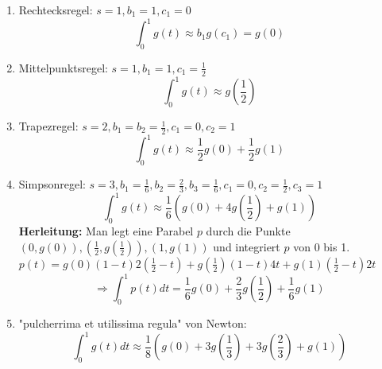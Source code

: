 \begin{example}
\begin{description}
  \item 
\end{description}
\begin{enumerate}
  \item Rechtecksregel: $s = 1, b_1 = 1, c_1 = 0$
    $$ \int_0^1 g(t) \approx b_1 g(c_1) = g(0)$$
  \item Mittelpunktsregel: $s = 1, b_1 = 1, c_1 = \frac{1}{2}$
    $$ \int_0^1 g(t) \approx g\left(\frac{1}{2}\right)$$
  \item Trapezregel: $s=2, b_1=b_2= \frac{1}{2}, c_1 = 0, c_2 = 1$
    $$ \int_0^1 g(t) \approx \frac{1}{2} g(0) + \frac{1}{2}g(1)$$
  \item Simpsonregel: $s=3, b_1 =  \frac{1}{6}, b_2 =  \frac{2}{3}, b_3 =  \frac{1}{6}, c_1 = 0, c_2 =  \frac{1}{2}, c_3 = 1$
    $$ \int_0^1 g(t) \approx \frac{1}{6} \left(g(0) + 4g\left(\frac{1}{2}\right) +g(1)\right)$$ 
    \textbf{Herleitung:} Man legt eine Parabel $p$ durch die Punkte $(0, g(0)), (\frac{1}{2}, g(\frac{1}{2})), (1, g(1))$ und integriert $p$ von 0 bis 1. \\
    $p(t) = g(0)(1-t)2(\frac{1}{2}-t) + g(\frac{1}{2})(1-t)4t + g(1)(\frac{1}{2}-t)2t$ \\
    $$\Rightarrow \int_0^1 p(t)dt = \frac{1}{6}g(0)+ \frac{2}{3}g\left(\frac{1}{2}\right) +\frac{1}{6}g(1)$$ 
  \item "pulcherrima et utilissima regula" von Newton:
    $$\int_0^1 g(t) dt \approx \frac{1}{8}\left(g(0) + 3g\left(\frac{1}{3}\right) + 3g\left(\frac{2}{3}\right) + g(1)\right)$$
\end{enumerate}

\end{example}

\begin{comment}[Monte-Carlo Integration]
\begin{description}
  \item 
\end{description}
\begin{enumerate}
  \item Eindimensionale Monte-Carlo Integration: \\
    Sei $a, b \in \mathbb{R}$, $a<b$. Wählt man $N$ unabhängige gleichverteilte Punkte $x_i$ in $[a,b]$ so gilt die Approximation:
    $$\int_a^b f(x) dx \approx \frac{1}{N} \sum_{j=1}^N (b-a)f(x_j)$$
    Nach dem Gesetz der großen Zahlen konvergiert dieser Ausdruck, falls 
    $$\int_a^b\vert f(x) \vert dx < \infty, \int_a^b f^2(x)dx < \infty$$
  \item Mehrdimensionale Monte-Carlo Integration: \\
    Sei $W=\otimes_{i=1}^d [a_i, b_i]$ ein d-dimensionaler Quader. Wählt man in W unabh. gleichvert. Zufallsvektoren $x_i$ in W, so ist
    $$\int_W f(x)dx \approx \frac{1}{N} Vol(W) \sum_{i=1}^N f(x_i),$$
    wobei $f:\mathbb{R}^d \rightarrow \mathbb{R}$.\\
    \textbf{Achtung:} Dieses gewöhnliche MC-Verfahren konvergiert sehr langsam. Verbesserungen sind z.B.: Importance sampling, Control variates, Antithetic variates und statified sampling.
\end{enumerate}
\end{comment}